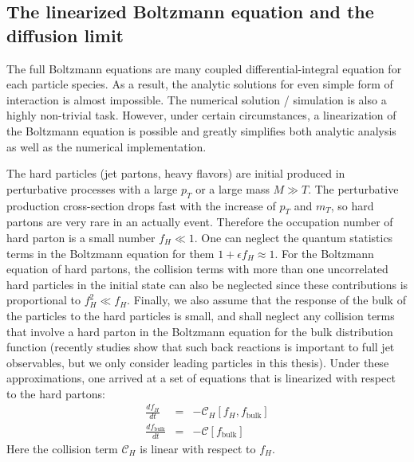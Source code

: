 \subsection{The linearized Boltzmann equation and the diffusion limit}
The full Boltzmann equations are many coupled differential-integral equation for each particle species. 
As a result, the analytic solutions for even simple form of interaction is almost impossible.
The numerical solution / simulation is also a highly non-trivial task.
However, under certain circumstances, a linearization of the Boltzmann equation is possible and greatly simplifies both analytic analysis as well as the numerical implementation.

The hard particles (jet partons, heavy flavors) are initial produced in perturbative processes with a large $p_T$ or a large mass $M \gg T$. 
The perturbative production cross-section drops fast with the increase of $p_T$ and $m_T$, so hard partons are very rare in an actually event. 
Therefore the occupation number of hard parton is a small number $f_H \ll 1$.
One can neglect the quantum statistics terms in the Boltzmann equation for them $1+\epsilon f_H \approx 1$.
For the Boltzmann equation of hard partons, the collision terms with more than one uncorrelated hard particles in the initial state can also be neglected since these contributions is proportional to $f_H^2 \ll f_H$. 
Finally, we also assume that the response of the bulk of the particles to the hard particles is small, and shall neglect any collision terms that involve a hard parton in the Boltzmann equation for the bulk distribution function (recently studies show that such back reactions is important to full jet observables, but we only consider leading particles in this thesis).
Under these approximations, one arrived at a set of equations that is linearized with respect to the hard partons:
\begin{eqnarray}
\frac{df_H}{dt} &=& -\mathcal{C}_H[f_H, f_{\textrm{bulk}}] \label{eq:hard-bulk-eq}\\
\frac{df_{\textrm{bulk}}}{dt} &=& -\mathcal{C}[f_{\textrm{bulk}}]
\end{eqnarray}
Here the collision term $\mathcal{C}_H$ is linear with respect to $f_H$.

